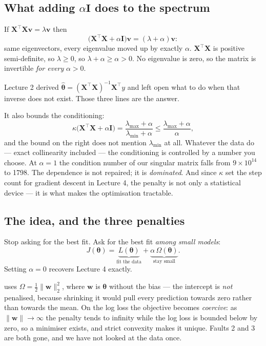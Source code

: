 \documentclass[11pt,a4paper]{article}
\begin{document}
\subsection{What adding $\alpha\mathbf{I}$ does to the spectrum}

\begin{derivbox}[title={Three lines, and Lecture 2 is closed}]
If $\mathbf{X}^{\intercal}\mathbf{X}\mathbf{v} = \lambda\mathbf{v}$ then
\[ \bigl(\mathbf{X}^{\intercal}\mathbf{X} + \alpha\mathbf{I}\bigr)\mathbf{v}
   = (\lambda + \alpha)\mathbf{v}: \]
same eigenvectors, every eigenvalue moved up by exactly $\alpha$.
$\mathbf{X}^{\intercal}\mathbf{X}$ is positive semi-definite, so $\lambda \ge
0$, so $\lambda + \alpha \ge \alpha > 0$. No eigenvalue is zero, so the matrix
is invertible \emph{for every} $\alpha > 0$.
\end{derivbox}

Lecture 2 derived $\hat{\boldsymbol\theta} = (\mathbf{X}^{\intercal}
\mathbf{X})^{-1}\mathbf{X}^{\intercal}y$ and left open what to do when that
inverse does not exist. Those three lines are the answer.

It also bounds the conditioning:
\[ \kappa\bigl(\mathbf{X}^{\intercal}\mathbf{X} + \alpha\mathbf{I}\bigr)
   = \frac{\lambda_{\max} + \alpha}{\lambda_{\min} + \alpha}
   \le \frac{\lambda_{\max} + \alpha}{\alpha}, \]
and the bound on the right does not mention $\lambda_{\min}$ at all. Whatever
the data do --- exact collinearity included --- the conditioning is controlled
by a number you choose. At $\alpha = 1$ the condition number of our singular
matrix falls from $9\times10^{14}$ to 1798. The dependence is not repaired; it
is \emph{dominated}. And since $\kappa$ set the step count for gradient descent
in Lecture 4, the penalty is not only a statistical device --- it is what makes
the optimisation tractable.

\subsection{The idea, and the three penalties}

Stop asking for the best fit. Ask for the best fit \emph{among small models}:
\[ J(\boldsymbol\theta) = \underbrace{L(\boldsymbol\theta)}_{\text{fit the data}}
   + \underbrace{\alpha\,\Omega(\boldsymbol\theta)}_{\text{stay small}}. \]
Setting $\alpha = 0$ recovers Lecture 4 exactly.

 uses $\Omega = \tfrac12\lVert\mathbf{w}\rVert_2^2$, where
$\mathbf{w}$ is $\boldsymbol\theta$ without the bias --- the intercept is
\emph{not} penalised, because shrinking it would pull every prediction towards
zero rather than towards the mean. On the log loss the objective becomes
\emph{coercive}: as $\lVert\mathbf{w}\rVert \to \infty$ the penalty tends to
infinity while the log loss is bounded below by zero, so a minimiser exists,
and strict convexity makes it unique. Faults 2 and 3 are both gone, and we have
not looked at the data once.
\end{document}
